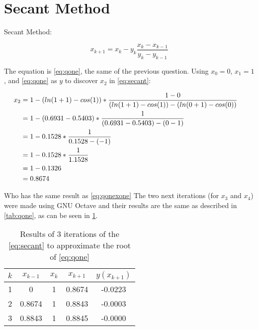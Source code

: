 \section{Secant Method}

	Secant Method:
	
	\begin{equation}
		x_{k+1} = x_{k} - y_{k}\frac{x_{k}-x_{k-1}}{y_{k}-y_{k-1}}
	\label{eq:secant}
	\end{equation}
	
	The equation is \cref{eq:qone}, the same of the previous question. Using $x_{0} = 0$, $x_{1} = 1$, and \cref{eq:qone} as $y$ to discover $x_{2}$ in \cref{eq:secant}:
	
	\begin{align}
		x_{2} &= 1 - \left( ln(1+1) - cos(1) \right)*\frac{1-0}{\left( ln(1+1) - cos(1) \right) - \left( ln(0+1) - cos(0) \right)}& \notag \\
		&= 1 - \left( 0.6931 - 0.5403 \right)*\frac{1}{\left( 0.6931 - 0.5403 \right) - \left( 0 - 1 \right)}& \notag \\
		&= 1 - 0.1528*\frac{1}{0.1528 - (-1)}& \notag \\
		&= 1 - 0.1528 *\frac{1}{1.1528}& \notag \\
		&= 1 - 0.1326& \notag \\
		&= 0.8674&
		\label{eq:qtwoxtwo}
	\end{align}

	Who has the same result as \cref{eq:qonexone}
	The two next iterations (for $x_{3}$ and $x_{4}$) were made using GNU Octave and their results are the same as described in \cref{tab:qone}, as can be seen in \cref{tab:qtwo}.

	\begin{table}[H]
		\begin{center}
			\begin{tabular}{|c||c|c||c|c|}
				\hline
				\textbf{$k$} & \textbf{$x_{k-1}$} & \textbf{$x_{k}$} & \textbf{$x_{k+1}$} & \textbf{$y(x_{k+1})$} \\ \hline
				1 & 0 & 1 & 0.8674 & -0.0223 \\ \hline
				2 & 0.8674 & 1 & 0.8843 & -0.0003 \\ \hline
				3 & 0.8843 & 1 & 0.8845 & -0.0000 \\ \hline
			\end{tabular}
			\caption{Results of 3 iterations of the \cref{eq:secant} to approximate the root of \cref{eq:qone}}
			\label{tab:qtwo}
		\end{center}
	\end{table}